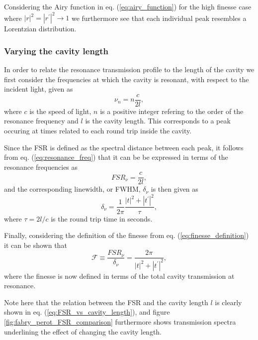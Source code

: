 Considering the Airy function in eq. (\ref{eq:airy_function}) for the high finesse case where $|r|^2 = |r^{\prime}|^2 \rightarrow 1$ we furthermore see that each individual peak resembles a Lorentzian distribution. 

\subsubsection{Varying the cavity length}

In order to relate the resonance transmission profile to the length of the cavity we first consider the frequencies at which the cavity is resonant, with respect to the incident light, given as
\begin{equation}
    \nu_n = n \frac{c}{2l},
    \label{eq:resonance_freq}
\end{equation}
where $c$ is the speed of light, $n$ is a positive integer refering to the order of the resonance frequency and $l$ is the cavity length. This corresponds to a peak occuring at times related to each round trip inside the cavity. 

Since the FSR is defined as the spectral distance between each peak, it follows from eq. (\ref{eq:resonance_freq}) that it can be be expressed in terms of the resonance frequencies as 
\begin{equation}
    FSR_{\nu} = \frac{c}{2l},
    \label{eq:FSR_vs_cavity_length}
\end{equation}
and the corresponding linewidth, or FWHM, $\delta_{\nu}$ is then given as
\begin{equation}
    \delta_{\nu} = \frac{1}{2 \pi} \frac{|t|^2 + |t^{\prime}|^2}{\tau},
\end{equation}
where $\tau = 2l/c$ is the round trip time in seconds. 

Finally, considering the definition of the finesse from eq. (\ref{eq:finesse_definition}) it can be shown that
\begin{equation}
    \mathcal{F} \equiv \frac{FSR_{\nu}}{\delta_{\nu}} = \frac{2 \pi}{|t|^2 + |t^{\prime}|^2},
    \label{eq:lossless_finesse}
\end{equation}
where the finesse is now defined in terms of the total cavity transmission at resonance. 

Note here that the relation between the FSR and the cavity length $l$ is clearly shown in eq. (\ref{eq:FSR_vs_cavity_length}), and figure \ref{fig:fabry_perot_FSR_comparison} furthermore shows transmission spectra underlining the effect of changing the cavity length. 

